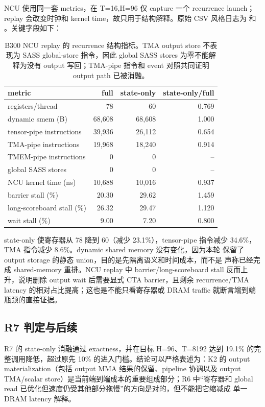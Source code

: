 NCU 使用同一套 metrics，在 T=16,H=96 仅 capture 一个 recurrence launch；
replay 会改变时钟和 kernel time，故只用于结构解释。原始 CSV 风格日志为
 和
。关键字段如下：

\begin{table}[htbp]
\centering
\small
\begin{tabular}{l r r r}
\toprule
metric & full & state-only & state-only/full \\
\midrule
registers/thread & 78 & 60 & 0.769 \\
dynamic smem (B) & 68,608 & 68,608 & 1.000 \\
tensor-pipe instructions & 39,936 & 26,112 & 0.654 \\
TMA-pipe instructions & 19,968 & 18,240 & 0.914 \\
TMEM-pipe instructions & 0 & 0 & -- \\
global SASS stores & 0 & 0 & -- \\
NCU kernel time (ns) & 10,688 & 10,016 & 0.937 \\
barrier stall (\%) & 20.30 & 29.62 & 1.459 \\
long-scoreboard stall (\%) & 26.32 & 29.47 & 1.120 \\
wait stall (\%) & 9.00 & 7.20 & 0.800 \\
\bottomrule
\end{tabular}
\caption{B300 NCU replay 的 recurrence 结构指标。TMA output store 不表现为
SASS global-store 指令，因此 global SASS stores 为零不能解释为没有 output
写回；TMA-pipe 指令和 event 对照共同证明 output path 已被消融。}
\end{table}

state-only 使寄存器从 78 降到 60（减少 23.1\%），tensor-pipe 指令减少
34.6\%，TMA 指令减少 8.6\%。dynamic shared memory 没有变化，因为本轮
保留了 output storage 的静态 union，目的是先隔离语义和时间成本，而不是
声称已经完成 shared-memory 重排。NCU replay 中 barrier/long-scoreboard
stall 反而上升，说明删除 output wait 后需要显式 CTA barrier，且剩余
recurrence/TMA latency 的相对占比提高；这也是不能只看寄存器或 DRAM traffic
就断言端到端瓶颈的直接证据。

\subsection{R7 判定与后续}

R7 的 state-only 消融通过 exactness，并在目标 H=96、T=8192 达到 19.1\%
的完整调用降低，超过原先 10\% 的进入门槛。结论可以严格表述为：K2 的
output materialization（包括 output MMA 结果的保留、pipeline 协调以及
output TMA/scalar store）是当前端到端成本的重要组成部分；R6 中“寄存器和
global read 已优化但速度仍受其他部分拖慢”的方向是对的，但不能把它缩减成
单一 DRAM latency 解释。

